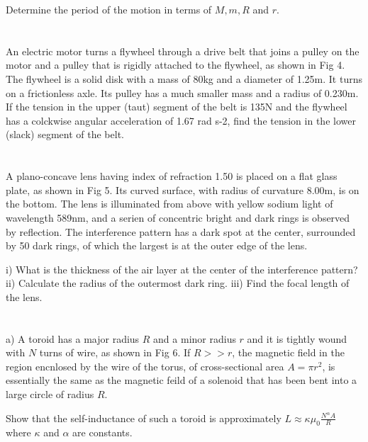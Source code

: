 \documentclass{article}
\newcommand{\<}{\langle}
\renewcommand{\>}{\rangle}
\begin{document}
Determine the period of the motion in terms of $M, m, R$ and $r$.

\section{}

An electric motor turns a flywheel through a drive belt that joins a pulley on the motor and a pulley that is rigidly attached to the flywheel, as shown in Fig 4. The flywheel is a solid disk with a mass of 80kg and a diameter of 1.25m. It turns on a frictionless axle. Its pulley has a much smaller mass and a radius of 0.230m. If the tension in the upper (taut) segment of the belt is 135N and the flywheel has a colckwise angular acceleration of 1.67 rad s-2, find the tension in the lower (slack) segment of the belt.

\section{}

A plano-concave lens having index of refraction 1.50 is placed on a flat glass plate, as shown in Fig 5. Its curved surface, with radius of curvature 8.00m, is on the bottom. The lens is illuminated from above with yellow sodium light of wavelength 589nm, and a serien of concentric bright and dark rings is observed by reflection. The interference pattern has a dark spot at the center, surrounded by 50 dark rings, of which the largest is at the outer edge of the lens.

i) What is the thickness of the air layer at the center of the interference pattern?
ii) Calculate the radius of the outermost dark ring.
iii) Find the focal length of the lens.

\section{}

a) A toroid has a major radius $R$ and a minor radius $r$ and it is tightly wound with $N$ turns of wire, as shown in Fig 6. If $R >> r$, the magnetic field in the region encnlosed by the wire of the torus, of cross-sectional area $A=\pi r^2$, is essentially the same as the magnetic feild of a solenoid that has been bent into a large circle of radius $R$.

Show that the self-inductance of such a toroid is approximately $L \approx \kappa\mu_0\frac{N^\alpha A}{R}$ where $\kappa$ and $\alpha$ are constants.
\end{document}
